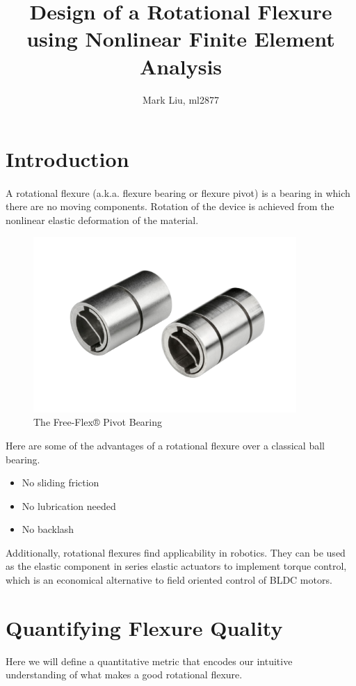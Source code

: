 \documentclass[11pt,letterpaper]{article}
\title{{\LARGE \bf Design of a Rotational Flexure using Nonlinear Finite Element Analysis}}
\author{Mark Liu, ml2877}
\date{}
\begin{document}
\pagestyle{plain}
\maketitle

\section{Introduction}
\paragraph{}
A rotational flexure (a.k.a. flexure bearing or flexure pivot) is a bearing in which there are no moving components. Rotation of the device is achieved from the nonlinear elastic deformation of the material.
\begin{figure}[H]
\begin{center}
\includegraphics[width=10cm, keepaspectratio]{flexure_pivot}
\caption{The Free-Flex® Pivot Bearing}
\label{flexure-pivot}
\end{center}
\end{figure}

Here are some of the advantages of a rotational flexure over a classical ball bearing.
\begin{itemize}
\item No sliding friction
\item No lubrication needed
\item No backlash
\end{itemize}

Additionally, rotational flexures find applicability in robotics. They can be used as the elastic component in series elastic actuators to implement torque control, which is an economical alternative to field oriented control of BLDC motors.

\section{Quantifying Flexure Quality}
Here we will define a quantitative metric that encodes our intuitive understanding of what makes a good rotational  flexure. 
\end{document}
